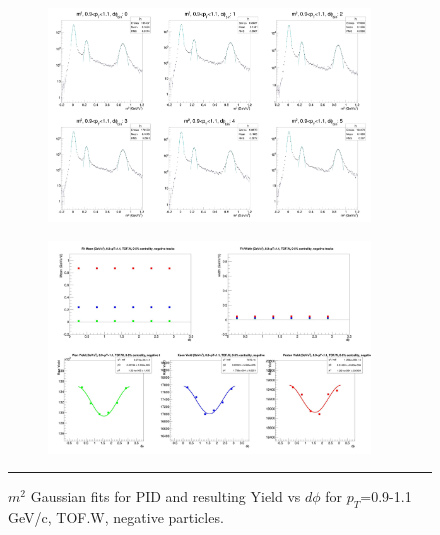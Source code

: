 \begin{figure}[H]
  \centering
    \begin{subfigure}[p]{1\textwidth}
   \centering
   \includegraphics[width=0.94\textwidth]{lowptfits/yieldvsdphi_tof1_cent0_ch0_pT-9-11.jpg}
    \end{subfigure}
    \begin{subfigure}[p]{1\textwidth}
   \centering
   \includegraphics[width=0.94\textwidth]{lowptfits/fitParams_tof1_cent0_ch0_pT-9-11.jpg}
    \end{subfigure}
    \rule{35em}{0.5pt}
  \caption[PID fits and Yield vs $d\phi$ for $p_T$=0.9-1.1 GeV/c, TOF.W, negative particles. ]{$m^2$ Gaussian fits for PID and resulting Yield vs $d\phi$ for $p_T$=0.9-1.1 GeV/c, TOF.W, negative particles.}
  \label{fig:fits9-11neg}
\end{figure}

